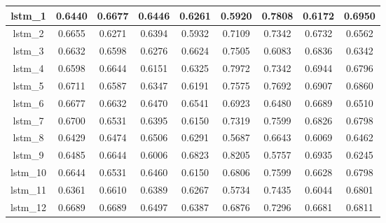 \begin{table}[h]
\begin{tabular} {|c|c|c|c|c|c|c|c|c| }
        lstm\_1  & 0.6440                        & 0.6677                         & 0.6446                      & 0.6261                  & 0.5920 & 0.7808 & 0.6172 & 0.6950 \\ \hline
        lstm\_2  & 0.6655                        & 0.6271                         & 0.6394                      & 0.5932                  & 0.7109 & 0.7342 & 0.6732 & 0.6562 \\ \hline
        lstm\_3  & 0.6632                        & 0.6598                         & 0.6276                      & 0.6624                  & 0.7505 & 0.6083 & 0.6836 & 0.6342 \\ \hline
        lstm\_4  & 0.6598                        & 0.6644                         & 0.6151                      & 0.6325                  & 0.7972 & 0.7342 & 0.6944 & 0.6796 \\ \hline
        lstm\_5  & 0.6711                        & 0.6587                         & 0.6347                      & 0.6191                  & 0.7575 & 0.7692 & 0.6907 & 0.6860 \\ \hline
        lstm\_6  & 0.6677                        & 0.6632                         & 0.6470                      & 0.6541                  & 0.6923 & 0.6480 & 0.6689 & 0.6510 \\ \hline
        lstm\_7  & 0.6700                        & 0.6531                         & 0.6395                      & 0.6150                  & 0.7319 & 0.7599 & 0.6826 & 0.6798 \\ \hline
        lstm\_8  & 0.6429                        & 0.6474                         & 0.6506                      & 0.6291                  & 0.5687 & 0.6643 & 0.6069 & 0.6462 \\ \hline
        lstm\_9  & 0.6485                        & 0.6644                         & 0.6006                      & 0.6823                  & 0.8205 & 0.5757 & 0.6935 & 0.6245 \\ \hline
        lstm\_10 & 0.6644                        & 0.6531                         & 0.6460                      & 0.6150                  & 0.6806 & 0.7599 & 0.6628 & 0.6798 \\ \hline
        lstm\_11 & 0.6361                        & 0.6610                         & 0.6389                      & 0.6267                  & 0.5734 & 0.7435 & 0.6044 & 0.6801 \\ \hline
        lstm\_12 & 0.6689                        & 0.6689                         & 0.6497                      & 0.6387                  & 0.6876 & 0.7296 & 0.6681 & 0.6811 \\ \hline

\end{tabular}
\end{table}
